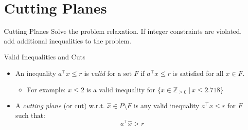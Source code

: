 \section{Cutting Planes}

\begin{frame}{Cutting Planes}
Solve the problem relaxation. If integer constraints are violated, add additional inequalities to the problem.

\end{frame}

\begin{frame}{Valid Inequalities and Cuts}
\begin{itemize}[<+->]
	\item An inequality $a^\top x \leq r$ is \emph{valid} for a set $F$ if $a^\top x \leq r$ is satisfied for all $x \in F$.
	\begin{itemize}
		\item For example: $x \leq 2$ is a valid inequality for $\{x \in \mathbb{Z}_{\geq 0} \:\vert\: x \leq 2.718 \}$
	\end{itemize}
	\item A \emph{cutting plane} (or cut) w.r.t. $\hat{x} \in P \setminus F$ is any valid inequality $a^\top x \leq r$ for $F$ such that:
	\begin{equation*}
		a^\top \hat{x} > r
	\end{equation*}
\end{itemize}

\end{frame}

